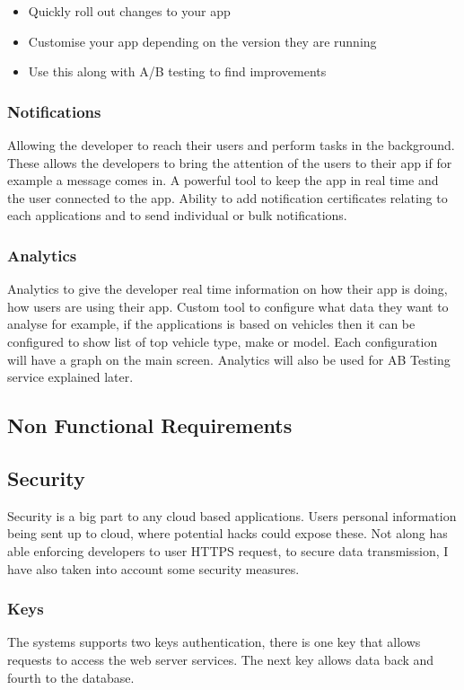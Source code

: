 \begin{itemize}
  \item Quickly roll out changes to your app
  \item Customise your app depending on the version they are running
  \item Use this along with A/B testing to find improvements
\end{itemize}

\subsubsection{Notifications}
Allowing the developer to reach their users and perform tasks in the background. These allows the developers to bring the attention of the users to their app if for example a message comes in. A powerful tool to keep the app in real time and the user connected to the app. Ability to add notification certificates relating to each applications and to send individual or bulk notifications.

\subsubsection{Analytics}
Analytics to give the developer real time information on how their app is doing, how users are using their app. Custom tool to configure what data they want to analyse for example, if the applications is based on vehicles then it can be configured to show list of top vehicle type, make or model. Each configuration will have a graph on the main screen. Analytics will also be used for AB Testing service explained later.

\subsection{Non Functional Requirements}

\subsection{Security}
Security is a big part to any cloud based applications. Users personal information being sent up to cloud, where potential hacks could expose these. Not along has able enforcing developers to user HTTPS request, to secure data transmission, I have also taken into account some security measures. 

\subsubsection{Keys}
The systems supports two keys authentication, there is one key that allows requests to access the web server services. The next key allows data back and fourth to the database.

